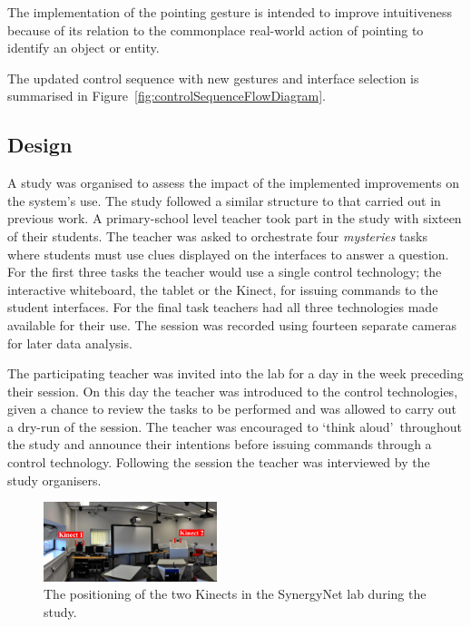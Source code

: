 \documentclass[link]{IWCOMP}
\begin{document}
The implementation of the pointing gesture is intended to improve intuitiveness because of its relation to the commonplace real-world action of pointing to identify an object or entity.

The updated control sequence with new gestures and interface selection is summarised in Figure~\ref{fig:controlSequenceFlowDiagram}.

\subsection{Design}
\label{subsec:studyDesign}


A study was organised to assess the impact of the implemented improvements on the system's use.
The study followed a similar structure to that carried out in previous work.
A primary-school level teacher took part in the study with sixteen of their students.
The teacher was asked to orchestrate four \textit{mysteries} tasks~\cite{AlAgha2010} where students must use clues displayed on the interfaces to answer a question.
For the first three tasks the teacher would use a single control technology; the interactive whiteboard, the tablet or the Kinect, for issuing commands to the student interfaces.
For the final task teachers had all three technologies made available for their use.
The session was recorded using fourteen separate cameras for later data analysis.

The participating teacher was invited into the lab for a day in the week preceding their session.
On this day the teacher was introduced to the control technologies, given a chance to review the tasks to be performed and was allowed to carry out a dry-run of the session.
The teacher was encouraged to \lq think aloud\rq\ throughout the study and announce their intentions before issuing commands through a control technology.
Following the session the teacher was interviewed by the study organisers.

\begin{figure}[h]
  \centering
  \includegraphics[width=0.45\textwidth]{figures/multiple_kinect_setup.png}
  \caption{The positioning of the two Kinects in the SynergyNet lab during the study.}
  \label{fig:kinectSetup}
\end{figure}
\end{document}
